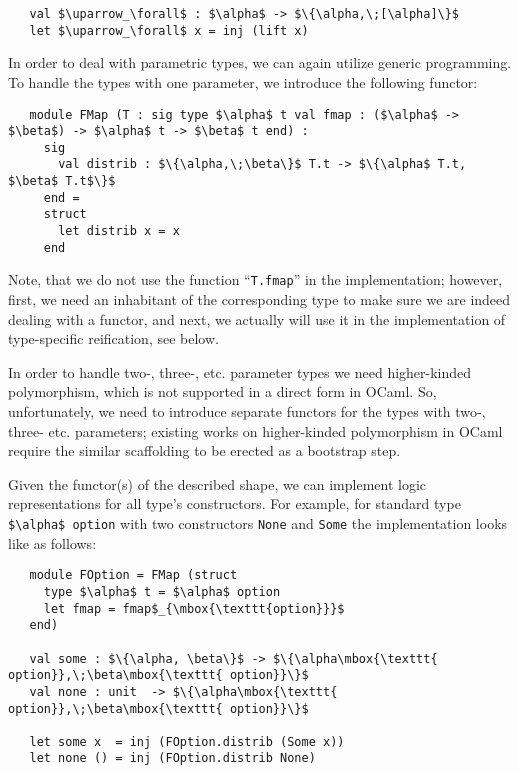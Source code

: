 \begin{lstlisting}
   val $\uparrow_\forall$ : $\alpha$ -> $\{\alpha,\;[\alpha]\}$
   let $\uparrow_\forall$ x = inj (lift x)
\end{lstlisting}

In order to deal with parametric types, we can again utilize generic programming. To handle the types with
one parameter, we introduce the following functor:

\begin{lstlisting}
   module FMap (T : sig type $\alpha$ t val fmap : ($\alpha$ -> $\beta$) -> $\alpha$ t -> $\beta$ t end) :
     sig
       val distrib : $\{\alpha,\;\beta\}$ T.t -> $\{\alpha$ T.t, $\beta$ T.t$\}$
     end =
     struct
       let distrib x = x
     end
\end{lstlisting}

Note, that we do not use the function ``\lstinline{T.fmap}'' in the implementation; however, first, we need an inhabitant of the
corresponding type to make sure we are indeed dealing with a functor, and next, we actually will use it in the
implementation of type-specific reification, see below.

In order to handle two-, three-, etc. parameter types we need higher-kinded polymorphism, which is
not supported in a direct form in OCaml. So, unfortunately, we need to introduce separate
functors for the types with two-, three- etc. parameters; existing works on higher-kinded
polymorphism in OCaml~\cite{HKinded} require the similar scaffolding to be erected as a bootstrap step.

Given the functor(s) of the described shape, we can implement logic representations for
all type's constructors. For example, for standard type \lstinline|$\alpha$ option| with two constructors
\lstinline|None| and \lstinline|Some| the implementation looks like as follows:

\begin{lstlisting}
   module FOption = FMap (struct
     type $\alpha$ t = $\alpha$ option
     let fmap = fmap$_{\mbox{\texttt{option}}}$
   end)

   val some : $\{\alpha, \beta\}$ -> $\{\alpha\mbox{\texttt{ option}},\;\beta\mbox{\texttt{ option}}\}$
   val none : unit  -> $\{\alpha\mbox{\texttt{ option}},\;\beta\mbox{\texttt{ option}}\}$

   let some x  = inj (FOption.distrib (Some x))
   let none () = inj (FOption.distrib None)
\end{lstlisting}

